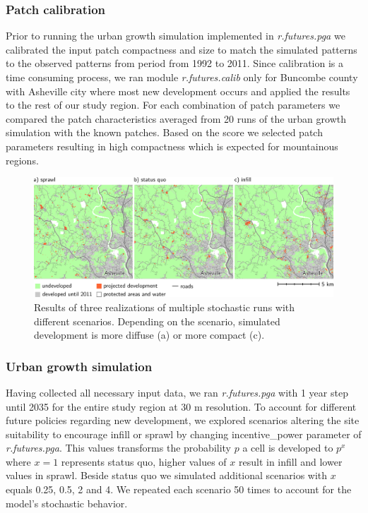 \documentclass{isprs}
\begin{document}
\subsubsection{Patch calibration}
Prior to running the urban growth simulation implemented in \emph{r.futures.pga}
we calibrated the input patch compactness and size to match
the simulated patterns to the observed patterns from period from 1992 to 2011.
Since calibration is a time consuming process, we ran module
\emph{r.futures.calib} only for Buncombe county with Asheville city
where most new development occurs and applied the results to the rest of our study region.
For each combination of patch parameters we compared the patch characteristics 
averaged from 20 runs of the urban growth simulation with the known patches.
Based on the score we selected patch parameters resulting in high compactness
which is expected for mountainous regions.

\begin{figure}[t]
 \centering
 \includegraphics[width=2.0\columnwidth]{./figures/results_maps.pdf}
 \caption{Results of three realizations of multiple stochastic runs with different scenarios.
 Depending on the scenario, simulated development is more diffuse (a) or more compact (c).}
 \label{fig:results}
\end{figure}

\subsubsection{Urban growth simulation}
Having collected all necessary input data, we ran 
\emph{r.futures.pga} with 1 year step until 2035 for the entire study region at 30 m resolution.
To account for different future policies regarding new development, we explored
scenarios altering the site suitability to encourage infill or sprawl by changing
incentive\_power parameter of \emph{r.futures.pga}. This values transforms
the probability $p$ a cell is developed to $p^x$ where $x = 1$ represents status quo,
higher values of $x$ result in infill and lower values in sprawl.
Beside status quo we simulated additional scenarios with $x$ equals 0.25, 0.5, 2 and 4.
We repeated each scenario 50 times to account for the model's stochastic behavior.
\end{document}
